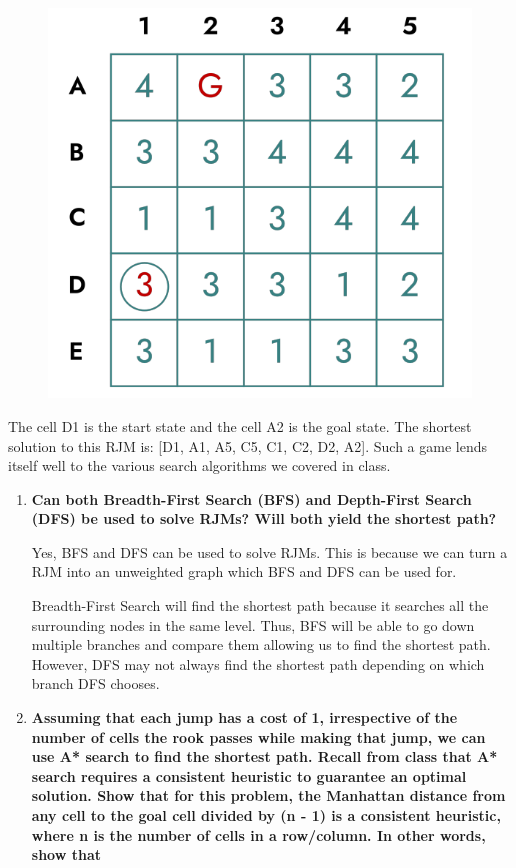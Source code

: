 \documentclass[a4paper]{article}
\begin{document}
\begin{sloppypar}
\begin{figure}[H]
    \centering  
    \includegraphics[height=0.2\textheight]{Search_RJM.png}
    \label{fig:Search_RJM}
\end{figure}

\noindent The cell D1 is the start state and the cell A2 is the goal state. The shortest solution to this
RJM is: [D1, A1, A5, C5, C1, C2, D2, A2]. Such a game lends itself well to the various
search algorithms we covered in class.

\begin{enumerate}[start=6,label=Q\arabic*,left=0pt]
    \item \textbf{Can both Breadth-First Search (BFS) and Depth-First Search (DFS) be used to solve RJMs? Will both yield the shortest path?}
    \par Yes, BFS and DFS can be used to solve RJMs. This is because we can turn a RJM into an unweighted graph which BFS and DFS 
    can be used for. 
    
    Breadth-First Search will find the shortest path because it searches all the surrounding nodes in the same level. Thus, BFS
    will be able to go down multiple branches and compare them allowing us to find the shortest path. However, DFS may not 
    always find the shortest path depending on which branch DFS chooses.

    \item \textbf{Assuming that each jump has a cost of 1, irrespective of the number of cells the rook
    passes while making that jump, we can use A* search to find the shortest path. Recall
    from class that A* search requires a consistent heuristic to guarantee an optimal solution.
    Show that for this problem, the Manhattan distance from any cell to the goal cell divided
    by (n - 1) is a consistent heuristic, where n is the number of cells in a row/column. In other words, show that}


\end{enumerate}
\end{sloppypar}
\end{document}
